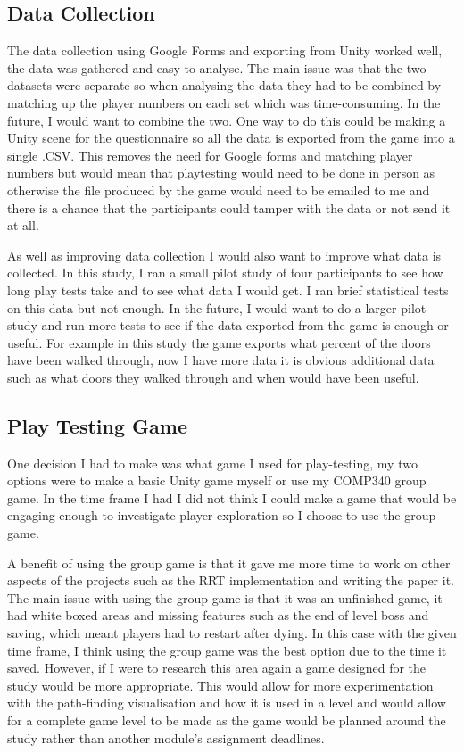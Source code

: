 \documentclass[journal]{IEEEtran}
\begin{document}
	\subsection{Data Collection}
	The data collection using Google Forms and exporting from Unity worked well, the data was gathered and easy to analyse. The main issue was that the two datasets were separate so when analysing the data they had to be combined by matching up the player numbers on each set which was time-consuming. In the future, I would want to combine the two. One way to do this could be making a Unity scene for the questionnaire so all the data is exported from the game into a single .CSV. This removes the need for Google forms and matching player numbers but would mean that playtesting would need to be done in person as otherwise the file produced by the game would need to be emailed to me and there is a chance that the participants could tamper with the data or not send it at all.
	
	As well as improving data collection I would also want to improve what data is collected. In this study, I ran a small pilot study of four participants to see how long play tests take and to see what data I would get. I ran brief statistical tests on this data but not enough. In the future, I would want to do a larger pilot study and run more tests to see if the data exported from the game is enough or useful. For example in this study the game exports what percent of the doors have been walked through, now I have more data it is obvious additional data such as what doors they walked through and when would have been useful.
	
	
	\subsection{Play Testing Game}
	One decision I had to make was what game I used for play-testing, my two options were to make a basic Unity game myself or use my COMP340 group game. In the time frame I had I did not think I could make a game that would be engaging enough to investigate player exploration so I choose to use the group game. 
	
	A benefit of using the group game is that it gave me more time to work on other aspects of the projects such as the RRT implementation and writing the paper it. 
	The main issue with using the group game is that it was an unfinished game, it had white boxed areas and missing features such as the end of level boss and saving, which meant players had to restart after dying.
	In this case with the given time frame, I think using the group game was the best option due to the time it saved. However, if I were to research this area again a game designed for the study would be more appropriate. This would allow for more experimentation with the path-finding visualisation and how it is used in a level and would allow for a complete game level to be made as the game would be planned around the study rather than another module's assignment deadlines.
	
\end{document}
